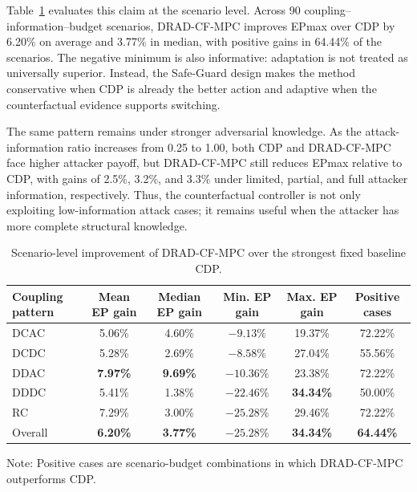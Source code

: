 \documentclass[lettersize,journal]{IEEEtran}
\newcommand{\best}[1]{\textbf{#1}}
\begin{document}
Table~\ref{tab:scenario_improvement_cdp} evaluates this claim at the scenario level. Across 90 coupling--information--budget scenarios, DRAD-CF-MPC improves EPmax over CDP by 6.20\% on average and 3.77\% in median, with positive gains in 64.44\% of the scenarios. The negative minimum is also informative: adaptation is not treated as universally superior. Instead, the Safe-Guard design makes the method conservative when CDP is already the better action and adaptive when the counterfactual evidence supports switching.

The same pattern remains under stronger adversarial knowledge. As the attack-information ratio increases from 0.25 to 1.00, both CDP and DRAD-CF-MPC face higher attacker payoff, but DRAD-CF-MPC still reduces EPmax relative to CDP, with gains of 2.5\%, 3.2\%, and 3.3\% under limited, partial, and full attacker information, respectively. Thus, the counterfactual controller is not only exploiting low-information attack cases; it remains useful when the attacker has more complete structural knowledge.

\begin{table}[!b]
\centering
\small
\begin{threeparttable}
\caption{Scenario-level improvement of DRAD-CF-MPC over the strongest fixed baseline CDP.}
\label{tab:scenario_improvement_cdp}
\begin{tabular}{lccccc}
\toprule
\rowcolor{TableHeader}
Coupling pattern 
& Mean EP gain 
& Median EP gain 
& Min. EP gain 
& Max. EP gain 
& Positive cases \\
\midrule
\rowcolor{RowScenario}
DCAC & 5.06\% & 4.60\% & $-9.13\%$ & 19.37\% & 72.22\% \\
\rowcolor{RowBaseline}
DCDC & 5.28\% & 2.69\% & $-8.58\%$ & 27.04\% & 55.56\% \\
\rowcolor{RowProposed}
DDAC & \best{7.97\%} & \best{9.69\%} & $-10.36\%$ & 23.38\% & 72.22\% \\
\rowcolor{RowRisk}
DDDC & 5.41\% & 1.38\% & $-22.46\%$ & \best{34.34\%} & 50.00\% \\
\rowcolor{RowPhysical}
RC & 7.29\% & 3.00\% & $-25.28\%$ & 29.46\% & 72.22\% \\
\midrule
\rowcolor{RowProposed}
Overall & \best{6.20\%} & \best{3.77\%} & $-25.28\%$ & \best{34.34\%} & \best{64.44\%} \\
\bottomrule
\end{tabular}
\begin{tablenotes}
\footnotesize
\item Note: Positive cases are scenario-budget combinations in which DRAD-CF-MPC outperforms CDP.
\end{tablenotes}
\end{threeparttable}
\end{table}
\end{document}
